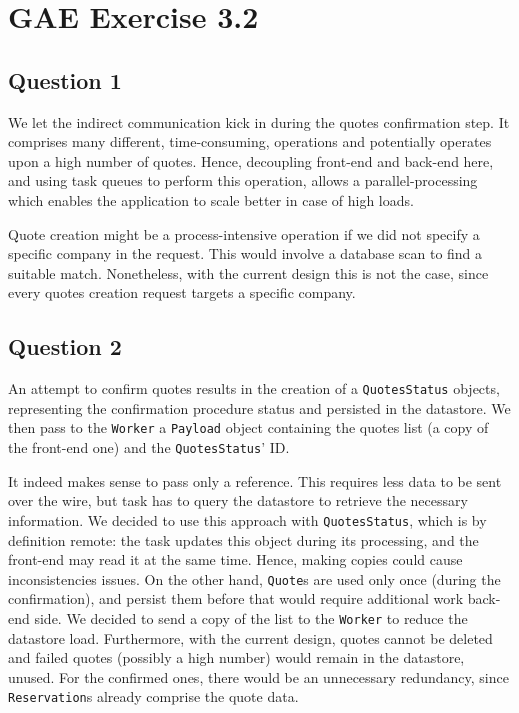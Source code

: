 \section{GAE Exercise 3.2}
\subsection{Question 1}
We let the indirect communication kick in during the quotes confirmation step. It comprises many different, time-consuming, operations and potentially operates upon a high number of quotes. Hence, decoupling front-end and back-end here, and using task queues to perform this operation, allows a parallel-processing which enables the application to scale better in case of high loads.

Quote creation might be a process-intensive operation if we did not specify a specific company in the request. This would involve a database scan to find a suitable match. Nonetheless, with the current design this is not the case, since every quotes creation request targets a specific company.

\subsection{Question 2} 
An attempt to confirm quotes results in the creation of a \texttt{QuotesStatus} objects, representing the confirmation procedure status and persisted in the datastore. We then pass to the \texttt{Worker} a \texttt{Payload} object containing the quotes list (a copy of the front-end one) and the \texttt{QuotesStatus}' ID.

It indeed makes sense to pass only a reference. This requires less data to be sent over the wire, but task has to query the datastore to retrieve the necessary information. We decided to use this approach with \texttt{QuotesStatus}, which is by definition remote: the task updates this object during its processing, and the front-end may read it at the same time. Hence, making copies could cause inconsistencies issues. On the other hand, \texttt{Quote}s are used only once (during the confirmation), and persist them before that would require additional work back-end side. We decided to send a copy of the list to the \texttt{Worker} to reduce the datastore load. Furthermore, with the current design, quotes cannot be deleted and failed quotes (possibly a high number) would remain in the datastore, unused. For the confirmed ones, there would be an unnecessary redundancy, since \texttt{Reservation}s already comprise the quote data.